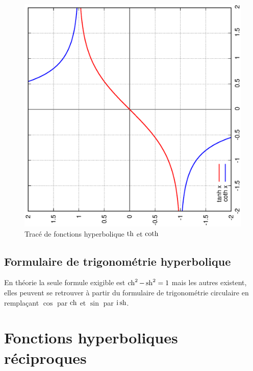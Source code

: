 \begin{figure}
  \centering
  \includegraphics[scale=0.4,angle=-90]{tanh.ps}
  \caption{Tracé de fonctions hyperbolique $\operatorname{th}$ et $\operatorname{coth}$}
  \label{fig:tracetanhcoth}
\end{figure}
%
\subsection{Formulaire de trigonométrie hyperbolique}
\label{subsec:chap1-formulairetrigohyp}
En théorie la seule formule exigible est $\operatorname{ch}^2-\operatorname{sh}^2=1$ mais les autres existent, elles peuvent se retrouver à partir du formulaire de trigonométrie circulaire en remplaçant $\cos$ par $\operatorname{ch}$ et $\sin$ par $\operatorname{i} \operatorname{sh}$.
%
\section{Fonctions hyperboliques réciproques}
\label{sec:chap1-fonctionshyprec}
